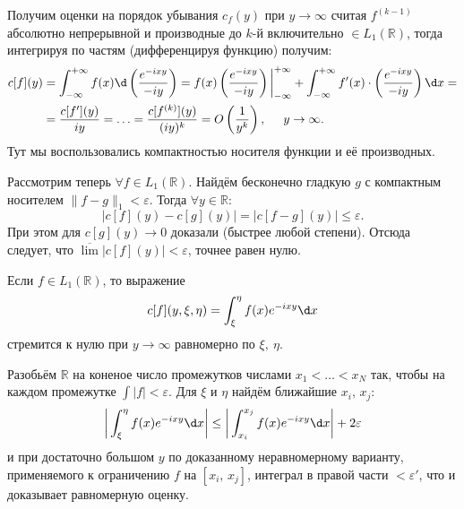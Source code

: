 \begin{uproof}
    Получим оценки на порядок убывания $c_f(y)$ при $y \to \infty$ считая $f ^{(k-1)}$ абсолютно непрерывной и производные до $k$-й включительно $\in L_1 \left(\mathbb{R}\right)$, тогда интегрируя по частям (дифференцируя функцию) получим:
    \begin{align*}
        c[f] (y) &= \int_{-\infty}^{+\infty} f(x) \d \left(
            \frac{e^{-ixy}}{-iy}
        \right) = f(x) \left(
            \frac{e^{-ixy}}{-iy}
        \right) \bigg|_{-\infty}^{+\infty} + \int_{-\infty}^{+\infty} f'(x) \cdot \left(
            \frac{e^{-ixy}}{-iy}
        \right) \d x 
        = \\ &=
        \frac{c[{f'}](y)}{iy} = \ldots = \frac{c[f^{(k)}](y)}{(iy)^k} = O\left(\frac{1}{y^k}\right), \hspace{5 mm} y \to \infty.
    \end{align*}
    Тут мы воспользовались компактностью носителя функции и её производных. 

    Рассмотрим теперь $\forall  f \in L_1(\mathbb{R})$. Найдём бесконечно гладкую $g$ с компактным носителем $\|f-g\|_1 < \varepsilon$. Тогда $\forall y \in \mathbb{R}$:
    \begin{equation*}
        |c[f](y) - c[g](y)| = |c[f-g](y)| \leq \varepsilon.
    \end{equation*}
    При этом для $c[g] (y) \to 0$ доказали (быстрее любой степени). Отсюда следует, что $\overline{\lim} |c[f](y)| < \varepsilon$, точнее равен нулю. 
\end{uproof}



\begin{to_thr}
    Если $f \in L_1(\mathbb{R})$, то выражение
    \begin{equation*}
        c[f](y, \xi, \eta) = \int_\xi^\eta f(x) e^{-ixy} \d x
    \end{equation*}
    стремится к нулю при $y \to \infty$ равномерно по $\xi, \ \eta$.
\end{to_thr}

\begin{uproof}
    Разобьём $\mathbb{R}$ на коненое число промежутков числами $x_1 < \ldots < x_N$ так, чтобы на каждом промежутке $\int |f| < \varepsilon $. Для $\xi$ и $\eta$ найдём ближайшие $x_i,\, x_j$:
    \begin{equation*}
        \bigg| 
            \int_{\xi}^{\eta} f(x) e^{-ixy} \d x
        \bigg| \leq 
        \bigg|
            \int_{x_i}^{x_j} f(x) e^{-ixy} \d x
        \bigg| + 2 \varepsilon
    \end{equation*}
    и при достаточно большом $y$ по доказанному неравномерному варианту, применяемого к ограничению $f$ на $[x_i,\, x_j]$, интеграл в правой части $< \varepsilon'$, что и доказывает равномерную оценку. 
\end{uproof}

